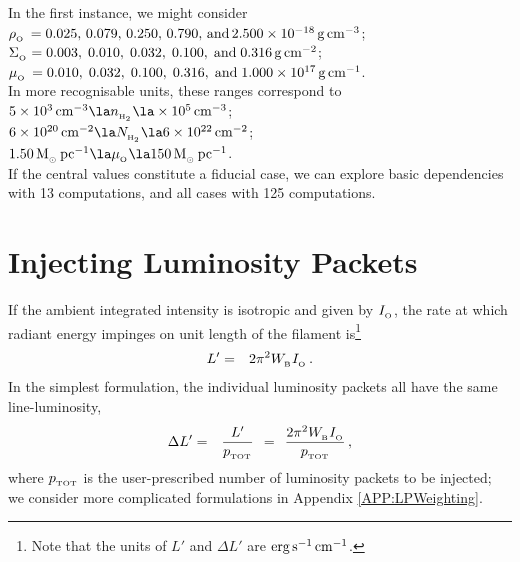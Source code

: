 \documentclass[usenatbib]{mn2e}
\newcommand{\subB}{_{_{\rm B}}}
\newcommand{\subO}{_{_{\rm O}}}
\numberwithin{equation}{section}
\begin{document}
In the first instance, we might consider \\

\noindent $\rho\subO\,=0.025,\,0.079,\,0.250,\,0.790,\,{\rm and}\,2.500\times 10^{-18}\,{\rm g}\,{\rm cm}^{-3}$;\\

\noindent $\Sigma\subO=0.003,\;0.010,\;0.032,\;0.100,\;{\rm and}\;0.316\,{\rm g}\,{\rm cm}^{-2}$;\\

\noindent $\mu\subO\,=0.010,\;0.032,\;0.100,\;0.316,\;{\rm and}\;1.000\times 10^{17}\,{\rm g}\,{\rm cm}^{-1}$.\\

\noindent In more recognisable units, these ranges correspond to\\

\noindent $5\times 10^3\,{\rm cm}^{-3}\la n_{_{\rm H_2}}\la \times 10^5\,{\rm cm}^{-3}$;\\

\noindent $6\times 10^{20}\,{\rm cm}^{-2}\la N_{_{\rm H_2}}\la 6\times 10^{22}\,{\rm cm}^{-2}$;\\

\noindent $1.50\,{\rm M}_{_\odot}\,{\rm pc}^{-1}\la \mu\subO\la 150\,{\rm M}_{_\odot}\,{\rm pc}^{-1}$.\\

\noindent If the central values constitute a fiducial case, we can explore basic dependencies with 13 computations, and all cases with 125 computations.





\section{Injecting Luminosity Packets}\label{SEC:InjectingLuminosityPackets}

If the ambient integrated intensity is isotropic and given by $I\subO$, the rate at which radiant energy impinges on unit length of the filament is\footnote{Note that the units of $L'$ and $\Delta L'$ are ${\rm erg}\,{\rm s}^{-1}\,{\rm cm}^{-1}$.} 
\begin{eqnarray}
L'&=&2\pi^2W\subB I\subO\,.
\end{eqnarray}
In the simplest formulation, the individual luminosity packets all have the same line-luminosity, 
\begin{eqnarray}
\Delta L'&=&\frac{L'}{p_{_{\rm TOT}}}\;\,=\;\,\frac{2\pi^2W\subB I\subO}{p_{_{\rm TOT}}}\,,
\end{eqnarray}
where $p_{_{\rm TOT}}$ is the user-prescribed number of luminosity packets to be injected; we consider more complicated formulations in Appendix \ref{APP:LPWeighting}. 
\end{document}

